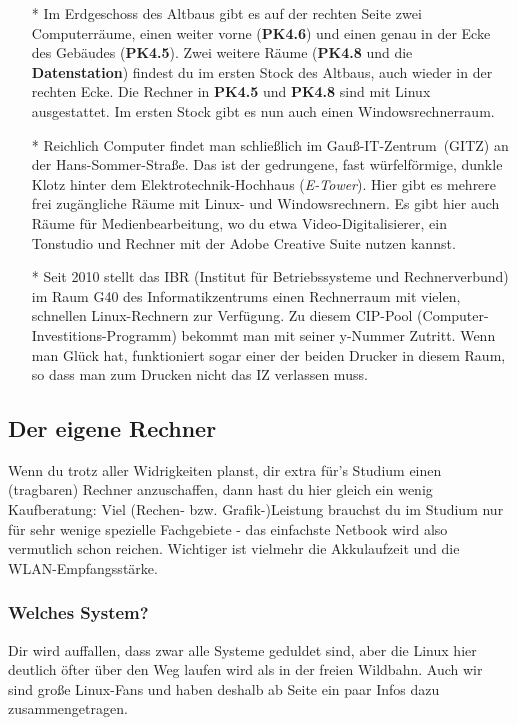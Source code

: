 			\begin{itemize}
				\item[*] Im Erdgeschoss des Altbaus gibt es auf der rechten Seite zwei Computerräume, einen weiter vorne (\textbf{PK4.6}) und einen genau in der Ecke des Gebäudes (\textbf{PK4.5}). Zwei weitere Räume (\textbf{PK4.8} und die \textbf{Datenstation}) findest du im ersten Stock des Altbaus, auch wieder in der rechten Ecke. Die Rechner in \textbf{PK4.5} und \textbf{PK4.8} sind mit Linux ausgestattet. Im ersten Stock gibt es nun auch einen Windowsrechnerraum.

				\item[*] Reichlich Computer findet man schließlich im Gauß-IT-Zentrum~(GITZ) an der Hans-Sommer-Straße. Das ist der gedrungene, fast würfelförmige, dunkle Klotz hinter dem Elektrotechnik-Hochhaus (\emph{E-Tower}). Hier gibt es mehrere frei zugängliche Räume mit Linux- und Windowsrechnern. Es gibt hier auch Räume für Medienbearbeitung, wo du etwa Video-Digitalisierer, ein Tonstudio und Rechner mit der Adobe Creative Suite nutzen kannst.

				\item[*] Seit 2010 stellt das IBR (Institut für Betriebssysteme und Rechnerverbund) im Raum G40 des Informatikzentrums einen Rechnerraum mit vielen, schnellen Linux-Rechnern  zur Verfügung. Zu diesem CIP-Pool (Computer-Investitions-Programm) bekommt man mit seiner y-Nummer Zutritt. Wenn man Glück hat, funktioniert sogar einer der beiden Drucker in diesem Raum, so dass man zum Drucken nicht das IZ verlassen muss.
			\end{itemize}

		\subsection{Der eigene Rechner}
			Wenn du trotz aller Widrigkeiten planst, dir extra für's Studium einen (tragbaren) Rechner anzuschaffen, dann hast du hier gleich ein wenig Kaufberatung: Viel (Rechen- bzw. Grafik-)Leistung brauchst du im Studium  nur für sehr wenige spezielle Fachgebiete - das einfachste Netbook wird also vermutlich schon reichen. Wichtiger ist vielmehr die Akkulaufzeit und die WLAN-Empfangsstärke.	

		\subsubsection{Welches System?}
			Dir wird auffallen, dass zwar alle Systeme geduldet sind, aber die Linux hier deutlich öfter über den Weg laufen wird als in der freien Wildbahn. Auch wir sind große Linux-Fans und haben deshalb ab Seite \pageref{linux} ein paar Infos dazu zusammengetragen.

